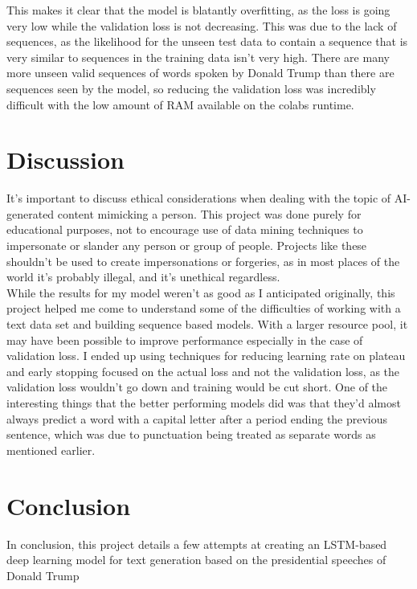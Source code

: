 \documentclass[a4paper]{article}
\begin{document}
This makes it clear that the model is blatantly overfitting, as the loss is going very low while the validation loss is not decreasing. This was due to the lack of sequences, as the likelihood for the unseen test data to contain a sequence that is very similar to sequences in the training data isn't very high. There are many more unseen valid sequences of words spoken by Donald Trump than there are sequences seen by the model, so reducing the validation loss was incredibly difficult with the low amount of RAM available on the colabs runtime.

\section {Discussion}
It's important to discuss ethical considerations when dealing with the topic of AI-generated content mimicking a person. This project was done purely for educational purposes, not to encourage use of data mining techniques to impersonate or slander any person or group of people. Projects like these shouldn't be used to create impersonations or forgeries, as in most places of the world it's probably illegal, and it's unethical regardless.\\

\noindent
While the results for my model weren't as good as I anticipated originally, this project helped me come to understand some of the difficulties of working with a text data set and building sequence based models. With a larger resource pool, it may have been possible to improve performance especially in the case of validation loss. I ended up using techniques for reducing learning rate on plateau and early stopping focused on the actual loss and not the validation loss, as the validation loss wouldn't go down and training would be cut short. One of the interesting things that the better performing models did was that they'd almost always predict a word with a capital letter after a period ending the previous sentence, which was due to punctuation being treated as separate words as mentioned earlier.

\section {Conclusion}
In conclusion, this project details a few attempts at creating an LSTM-based deep learning model for text generation based on the presidential speeches of Donald Trump
\end{document}

